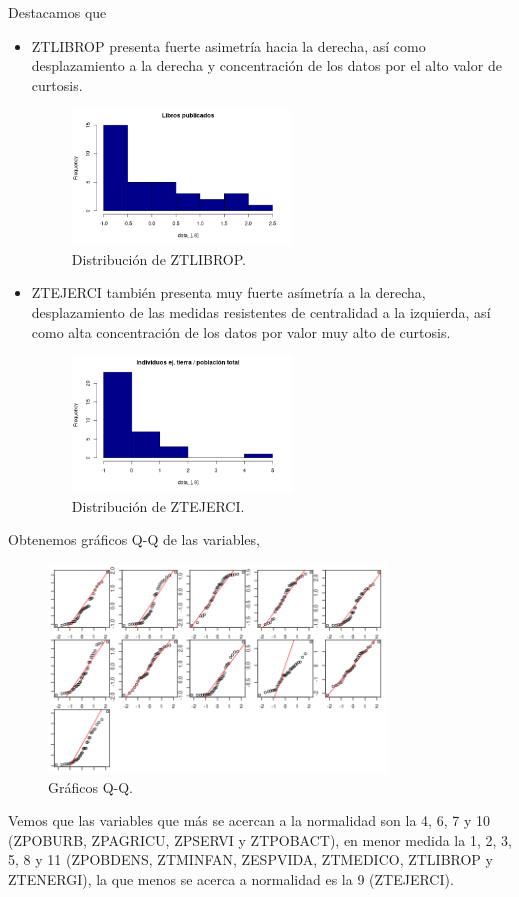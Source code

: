 \documentclass[11pt,a4paper]{article}
\begin{document}
	Destacamos que
	\begin{itemize}
		\item ZTLIBROP presenta fuerte asimetría hacia la derecha, así como desplazamiento a la derecha y concentración de los datos por el alto valor de curtosis.
		\begin{figure}[H]
		\centering
		\includegraphics[width=0.55\textwidth]{images/ztlibrop}
		\caption{Distribución de ZTLIBROP.}
	\end{figure}
	
		\item ZTEJERCI también presenta muy fuerte asímetría a la derecha, desplazamiento de las medidas resistentes de centralidad a la izquierda, así como alta concentración de los datos por valor muy alto de curtosis.
		
		\begin{figure}[H]
		\centering
		\includegraphics[width=0.55\textwidth]{images/ztejerci}
		\caption{Distribución de ZTEJERCI.}
	\end{figure}
	\end{itemize}
	
	
	
	Obtenemos gráficos Q-Q de las variables,
	\begin{figure}[H]
		\centering
		\includegraphics[width=0.8\textwidth]{images/qqplot}
		\caption{Gráficos Q-Q.}
	\end{figure}
	Vemos que las variables que más se acercan a la normalidad son la 4, 6, 7 y 10 (ZPOBURB, ZPAGRICU, ZPSERVI y ZTPOBACT), en menor medida la 1, 2, 3, 5, 8 y 11 (ZPOBDENS, ZTMINFAN, ZESPVIDA, ZTMEDICO, ZTLIBROP y ZTENERGI), la que menos se acerca a normalidad es la 9 (ZTEJERCI).
	
\end{document}
